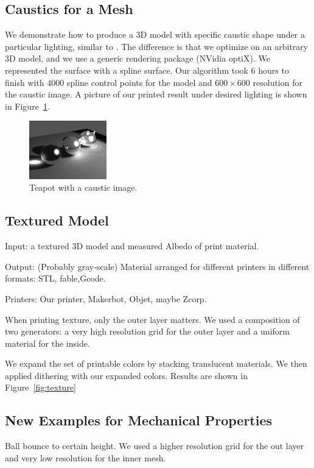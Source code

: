 \documentclass[annual]{acmsiggraph}
\begin{document}
\subsection{Caustics for a Mesh}
We demonstrate how to produce a 3D model with specific caustic shape under a particular lighting,
similar to \cite{Finckh:2010}. The difference is that we optimize on an arbitrary 3D model,
and we use a generic rendering package (NVidia optiX). 
We represented the surface with a spline surface.
Our algorithm took 6 hours to finish
with $4000$ spline control points for the model and $600\times 600$ resolution for the caustic image. A 
picture of our printed result under desired lighting is shown in Figure~\ref{fig:caustic}.

\begin{figure}
	\centering
 	\includegraphics[width=0.3\textwidth]{figure/caustic.jpg}
\caption{Teapot with a caustic image.}
\label{fig:caustic}
\end{figure}

\subsection{Textured Model}
Input: a textured 3D model and
measured Albedo of print material.

Output: (Probably gray-scale) Material arranged for different printers in different formats: STL, fable,Gcode.

Printers: Our printer, Makerbot, Objet, maybe Zcorp.

When printing texture, only the outer layer matters. We used 
a composition of two generators: a very high resolution grid
for the outer layer and a uniform material for the inside.

We expand the set of printable colors by stacking translucent materials. We then applied
dithering with our expanded colors.
Results are shown in Figure~\ref{fig:texture}
\subsection{New Examples for Mechanical Properties}
Ball bounce to certain height. We used a higher resolution
grid for the out layer and very low resolution
for the inner mesh.
\end{document}
